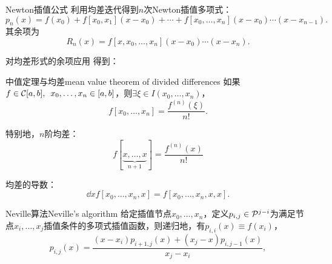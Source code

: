 \begin{theorem}
    {Newton插值公式}{}
    利用均差迭代得到$n$次Newton插值多项式：
    \begin{equation}
        p_n(x)=f(x_0)+f[x_0,x_1](x-x_0)+\cdots+f[x_0,\ldots,x_n](x-x_0)\cdots(x-x_{n-1}).
    \end{equation}
    其余项为
    \begin{equation}
        R_n(x)=f[x,x_0,\ldots,x_n](x-x_0)\cdots(x-x_n).
    \end{equation}
\end{theorem}

对均差形式的余项应用 得到：

\begin{theorem}
    {中值定理与均差}{mean value theorem of divided differences}
    如果$f\in\mathcal C[a,b],\enspace x_0,\ldots,x_n\in[a,b]$，则$\exists\xi\in I(x_0,\ldots,x_n)$，
    \begin{equation}
        f[x_0,\ldots,x_n]=\frac{f^{(n)}(\xi)}{n!}.
    \end{equation}
\end{theorem}

\begin{corollary}
    特别地，$n$阶均差：
    \begin{equation}
        f[\underbrace{x,\ldots,x}_{n+1}]=\frac{f^{(n)}(x)}{n!}
    \end{equation}
\end{corollary}
\begin{corollary}
    均差的导数：
    \begin{equation}
        \dd xf[x_0,\ldots,x_n,x]=f[x_0,\ldots,x_n,x,x].
    \end{equation}
\end{corollary}

\begin{theorem}
    {Neville算法}{Neville's algorithm}
    给定插值节点$x_0,\ldots,x_n$，定义$p_{i,j}\in\mathcal P^{j-i}$为满足节点$x_i,\ldots,x_j$插值条件的多项式插值函数，则递归地，有$p_{i,i}(x)\equiv f(x_i)$，
    \begin{equation}
        \label{eqn:Neville}
        p_{i,j}(x)=\frac{(x-x_i)p_{i+1,j}(x)+(x_j-x)p_{i,j-1}(x)}{x_j-x_i},
    \end{equation}
\end{theorem}

